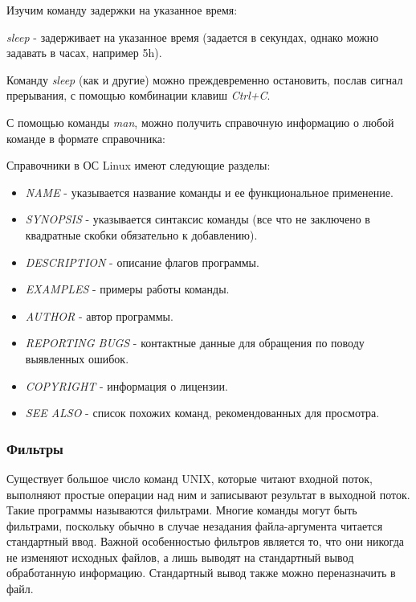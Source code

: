 \documentclass[14pt,a4paper,report]{report}
\begin{document}
Изучим команду задержки на указанное время:



\emph{sleep} - задерживает на указанное время (задается в секундах, однако можно задавать в часах, например 5h).

Команду \emph{sleep} (как и другие) можно преждевременно остановить, послав сигнал прерывания, с помощью комбинации клавиш \emph{Ctrl+C}.

С помощью команды \emph{man}, можно получить справочную информацию о любой команде в формате справочника:



Справочники в ОС Linux имеют следующие разделы:

\begin{itemize}
	\item \emph{NAME} - указывается название команды и ее функциональное применение.
	\item \emph{SYNOPSIS} - указывается синтаксис команды (все что не заключено в квадратные скобки обязательно к добавлению).
	\item \emph{DESCRIPTION} - описание флагов программы.
	\item \emph{EXAMPLES} - примеры работы команды.
	\item \emph{AUTHOR} - автор программы.
	\item \emph{REPORTING BUGS} - контактные данные для обращения по поводу выявленных ошибок.
	\item \emph{COPYRIGHT} - информация о лицензии.
	\item \emph{SEE ALSO} - список похожих команд, рекомендованных для просмотра.
\end{itemize}

\subsubsection{Фильтры}

Существует большое  число  команд  UNIX,  которые  читают входной поток,  выполняют  простые операции над ним и записывают результат в выходной поток.  Такие программы называются фильтрами. Многие команды могут быть фильтрами, поскольку обычно в случае незадания файла-аргумента читается стандартный ввод.  Важной особенностью фильтров  является то,  что они никогда не изменяют исходных файлов,  а лишь выводят на стандартный вывод обработанную информацию.  Стандартный  вывод  также можно переназначить в файл.
\end{document}

